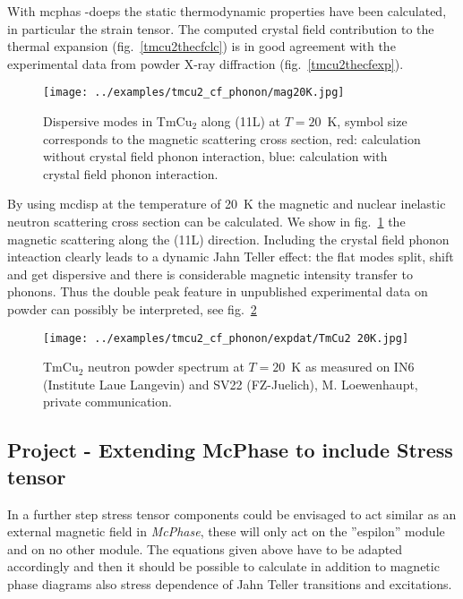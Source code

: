 With {\prg mcphas -doeps} the static thermodynamic properties have been calculated, in particular
the strain tensor. The computed crystal field contribution to the thermal expansion (fig.~\ref{tmcu2thecfclc}) is 
in good agreement with the experimental data from powder X-ray diffraction (fig.~\ref{tmcu2thecfexp}).


\begin{figure}[htb]%
\begin{center}\leavevmode
\texttt{[image: ../examples/tmcu2\_cf\_phonon/mag20K.jpg]}
\end{center}
\caption{Dispersive modes in TmCu$_2$ along (11L) at $T=20$~K, symbol size corresponds to the 
magnetic scattering cross section, red: calculation without crystal field phonon interaction, blue:
calculation with crystal field phonon interaction.}
\label{tmcu2mag20k}
\end{figure}

By using {\prg mcdisp} at the temperature of 20~K the magnetic and nuclear inelastic neutron
scattering cross section can be calculated. We show in fig.~\ref{tmcu2mag20k} the magnetic scattering along
the (11L) direction. Including the crystal field phonon inteaction clearly leads to a dynamic
Jahn Teller effect: the flat modes  split, shift and get
dispersive and there is considerable magnetic intensity transfer to phonons.
Thus the double peak feature in unpublished experimental data on powder can possibly
be interpreted, see fig.~\ref{tmcu2mag20kexp}

\begin{figure}[htb]%
\begin{center}\leavevmode
\texttt{[image: ../examples/tmcu2\_cf\_phonon/expdat/TmCu2 20K.jpg]}
\end{center}
\caption{TmCu$_2$ neutron powder spectrum at $T=20$~K as measured on IN6 (Institute Laue Langevin) and
SV22 (FZ-Juelich), M. Loewenhaupt, private communication.}
\label{tmcu2mag20kexp}
\end{figure}

\clearpage

\subsection{Project - Extending McPhase to include Stress tensor}

 In a further step stress tensor components could be envisaged 
to act similar as an external magnetic field in {\em McPhase}, these will only act on the
''espilon'' module and on no other module. The equations given above have to be adapted accordingly 
and then it should be possible to calculate in addition to magnetic phase diagrams also stress dependence
of Jahn Teller transitions and excitations. 


